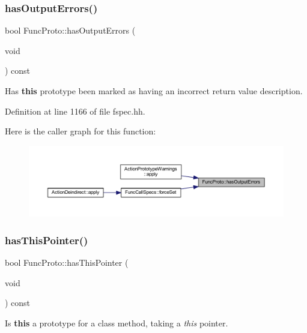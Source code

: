 \subsubsection{\texorpdfstring{hasOutputErrors()}{hasOutputErrors()}}
{\footnotesize\ttfamily bool Func\+Proto\+::has\+Output\+Errors (\begin{DoxyParamCaption}\item[{void}]{ }\end{DoxyParamCaption}) const\hspace{0.3cm}{\ttfamily [inline]}}



Has {\bfseries{this}} prototype been marked as having an incorrect return value description. 



Definition at line 1166 of file fspec.\+hh.

Here is the caller graph for this function\+:
\nopagebreak
\begin{figure}[H]
\begin{center}
\leavevmode
\includegraphics[width=350pt]{class_func_proto_ace0306cd7ee2a040dd783bd5e7606370_icgraph}
\end{center}
\end{figure}
\mbox{\label{class_func_proto_a2a274b3ff58e50e73e4eaa82cb08bae3}} 
\subsubsection{\texorpdfstring{hasThisPointer()}{hasThisPointer()}}
{\footnotesize\ttfamily bool Func\+Proto\+::has\+This\+Pointer (\begin{DoxyParamCaption}\item[{void}]{ }\end{DoxyParamCaption}) const\hspace{0.3cm}{\ttfamily [inline]}}



Is {\bfseries{this}} a prototype for a class method, taking a {\itshape this} pointer. 



